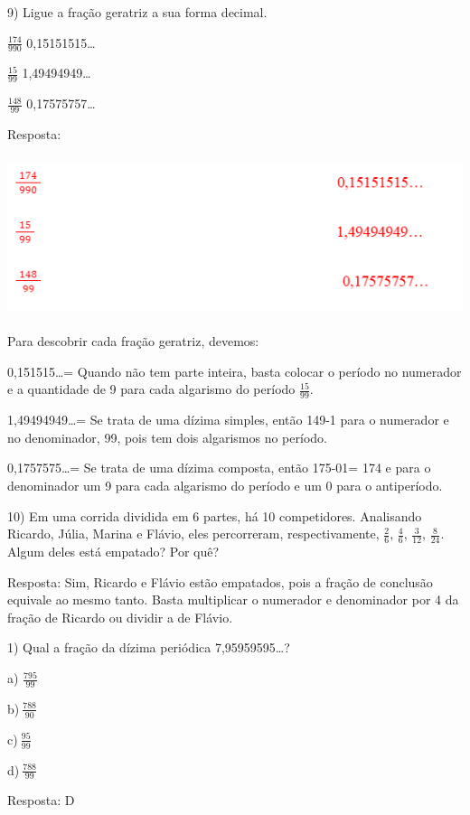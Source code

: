 9) Ligue a fração geratriz a sua forma decimal.

\(\frac{174}{990}\) 0,15151515\ldots{}

\(\frac{15}{99}\) 1,49494949\ldots{}

\(\frac{148}{99}\) 0,17575757\ldots{}

Resposta:

\includegraphics[width=5.58333in,height=1.84375in]{./imgSAEB_7_MAT/media/image10.png}

Para descobrir cada fração geratriz, devemos:

0,151515\ldots= Quando não tem parte inteira, basta colocar o período no
numerador e a quantidade de 9 para cada algarismo do período
\(\frac{15}{99}\).

1,49494949\ldots= Se trata de uma dízima simples, então 149-1 para o
numerador e no denominador, 99, pois tem dois algarismos no período.

0,1757575\ldots= Se trata de uma dízima composta, então 175-01= 174 e
para o denominador um 9 para cada algarismo do período e um 0 para o
antiperíodo.

10) Em uma corrida dividida em 6 partes, há 10 competidores. Analisando
Ricardo, Júlia, Marina e Flávio, eles percorreram, respectivamente,
\(\frac{2}{6}\), \(\frac{4}{6}\), \(\frac{3}{12}\), \(\frac{8}{24}\).
Algum deles está empatado? Por quê?

Resposta: Sim, Ricardo e Flávio estão empatados, pois a fração de
conclusão equivale ao mesmo tanto. Basta multiplicar o numerador e
denominador por 4 da fração de Ricardo ou dividir a de Flávio.


1) Qual a fração da dízima periódica 7,95959595\ldots?

a) \(\frac{795}{99}\)

b)\(\ \frac{788}{90}\)

c)\(\ \frac{95}{99}\)

d)\(\ \frac{788}{99}\)

Resposta: D


